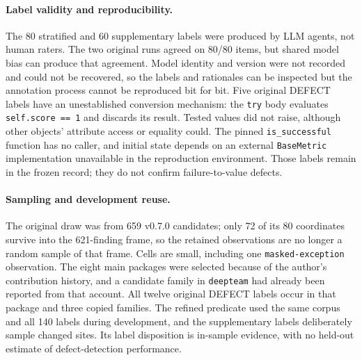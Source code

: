 \documentclass[10pt,a4paper]{article}
\begin{document}
\paragraph{Label validity and reproducibility.}
The 80 stratified and 60 supplementary labels were produced by LLM agents,
not human raters. The two original runs agreed on 80/80 items, but shared
model bias can produce that agreement. Model identity and version were not
recorded and could not be recovered, so the labels and rationales can be
inspected but the annotation process cannot be reproduced bit for bit.
Five original DEFECT labels have an unestablished conversion mechanism:
the \texttt{try} body evaluates \texttt{self.score == 1} and discards its
result. Tested values did not raise, although other objects' attribute
access or equality could. The pinned \texttt{is\_successful} function has
no caller, and initial state depends on an external \texttt{BaseMetric}
implementation unavailable in the reproduction environment. Those labels
remain in the frozen record; they do not confirm failure-to-value defects.

\paragraph{Sampling and development reuse.}
The original draw was from 659 v0.7.0 candidates; only 72 of its 80
coordinates survive into the 621-finding frame, so the retained observations
are no longer a random sample of that frame. Cells are small, including
one \texttt{masked-exception} observation. The eight main packages were
selected because of the author's contribution history, and a candidate
family in \texttt{deepteam} had already been reported from that account.
All twelve original DEFECT labels occur in that package and three copied
families. The refined predicate used the same corpus and all 140 labels
during development, and the supplementary labels deliberately sample
changed sites. Its label disposition is in-sample evidence, with no
held-out estimate of defect-detection performance.
\end{document}
